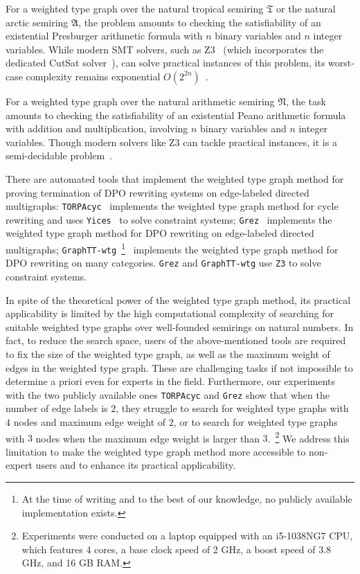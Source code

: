     For a weighted type graph over the natural tropical semiring $\mathfrak{T}$ or the natural arctic semiring $\mathfrak{A}$, the problem amounts to
    checking the satisfiability of an existential Presburger arithmetic formula with $n$ binary variables and $n$ integer variables.
    While modern SMT solvers, such as Z3~\cite{de2008z3} (which incorporates the dedicated CutSat solver~\cite{z3ilp_cutsat}), can solve practical instances of this problem, its worst-case complexity remains exponential \( O(2^{2n}) \)~\cite{arithmetic2024z3}.

     For a weighted type graph over the natural arithmetic semiring $\mathfrak{N}$, the task amounts to
     checking the satisfiability of an existential Peano arithmetic formula with addition and multiplication, involving $n$ binary variables and $n$ integer variables. Though modern solvers like Z3 can tackle practical instances, it is a semi-decidable problem~\cite{matiyasevivc2003enumerable}.

    There are automated tools that implement the weighted type graph method for proving termination of DPO rewriting systems on edge-labeled directed multigraphs:  
    \texttt{TORPAcyc}~\cite{TORPAcyc} implements the weighted type graph method for cycle rewriting and uses \texttt{Yices}~\cite{yices} to solve constraint systems;
    \texttt{Grez}~\cite{grez} implements the weighted type graph method for DPO rewriting on edge-labeled directed multigraphs; \texttt{GraphTT-wtg}~\footnote{
    At the time of writing and to the best of our knowledge, 
    no publicly available implementation exists.}~\cite{endrullis2024generalized_arxiv_v3} implements the weighted type graph method for DPO rewriting on many categories.
    \texttt{Grez} and \texttt{GraphTT-wtg}  
    use \texttt{Z3} to solve constraint systems.
 
    In spite of the theoretical power of the weighted type graph method, its practical applicability is limited by the high computational complexity of searching for suitable weighted type graphs over well-founded semirings on 
    natural numbers. In fact, to reduce the search space, users of the above-mentioned tools are required
     to fix the size of the weighted type graph, as well as the maximum weight of edges in the weighted type graph. These are challenging tasks if not impossible to determine a priori even for experts in the field. 
    Furthermore, our experiments with the two publicly available ones \texttt{TORPAcyc} and \texttt{Grez} show that when the number of edge labels is $2$, they struggle to search for weighted type graphs with $4$ nodes and maximum edge weight of $2$, or to search for weighted type graphs with $3$ nodes when the maximum edge weight is larger than $3$.~\footnote{Experiments were conducted on a laptop equipped with an i5-1038NG7 CPU, which features 4 cores, a base clock speed of 2 GHz, a boost speed of 3.8 GHz, and 16 GB RAM.}
   We address this limitation to make the weighted type graph method more accessible to non-expert users and to enhance its practical applicability.

